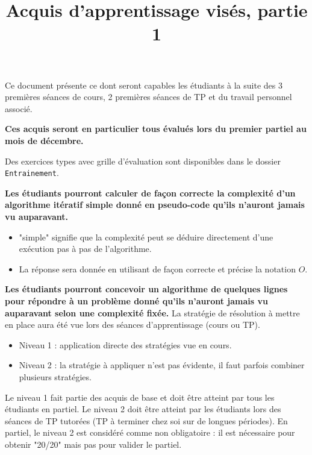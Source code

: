 \documentclass{../cours}
\title{Acquis d'apprentissage visés, partie 1}
\begin{document}
\maketitle

Ce document présente ce dont seront capables les étudiants à la suite des 3 premières séances de cours, 2 premières séances de TP et du travail personnel associé. 

\textbf{Ces acquis seront en particulier tous évalués lors du premier partiel au mois de décembre.}

Des exercices types avec grille d'évaluation sont disponibles dans le dossier \texttt{Entrainement}.

\begin{aav}
\textbf{Les étudiants pourront calculer de façon correcte la complexité d'un algorithme itératif simple donné en pseudo-code qu'ils n’auront jamais vu auparavant.} 
\begin{itemize}
\item "simple" signifie que la complexité peut se déduire directement d'une exécution pas à pas de l'algorithme.
\item La réponse sera donnée en utilisant de façon correcte et précise la notation $O$.
\end{itemize}
\end{aav}

\begin{aav}
\textbf{Les étudiants pourront concevoir un algorithme de quelques lignes pour répondre à un problème donné qu'ils n'auront jamais vu auparavant selon une complexité fixée.} La stratégie de résolution à mettre en place aura été vue lors des séances d'apprentissage (cours ou TP). 
\begin{itemize}
\item Niveau 1 : application directe des stratégies vue en cours.
\item Niveau 2 : la stratégie à appliquer n'est pas évidente, il faut parfois combiner plusieurs stratégies. 
\end{itemize}

Le niveau 1 fait partie des acquis de base et doit être atteint par tous les étudiants en partiel. Le niveau 2 doit être atteint par les étudiants lors des séances de TP tutorées (TP à terminer chez soi sur de longues périodes). En partiel, le niveau 2 est considéré comme non obligatoire : il est nécessaire pour obtenir "20/20" mais pas pour valider le partiel.
\end{aav}
\end{document}
